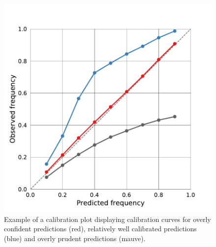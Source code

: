 \documentclass[journal abbreviation, manuscript]{copernicus}
\begin{document}
\begin{figure}[hbpt!]
  \centering
  \includegraphics[width = 0.5\linewidth]{../plots/calibration_plot_example}
  \caption{Example of a calibration plot displaying calibration curves for
           overly confident predictions (red), relatively well calibrated predictions (blue)
           and overly prudent predictions (mauve).}
  \label{fig:calibration_plot_example}
\end{figure}
\end{document}
